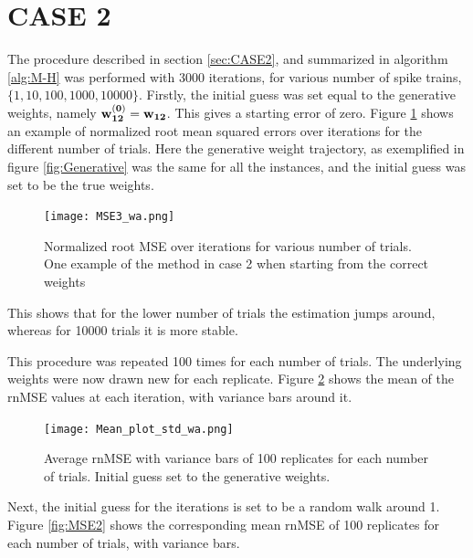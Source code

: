 \section{CASE 2}
\label{sec:CASE2_r}
The procedure described in section \ref{sec:CASE2}, and summarized in algorithm \ref{alg:M-H} was performed with 3000 iterations, for various number of spike trains, $ \{1,10,100,1000,10000 \}$. Firstly, the initial guess was set equal to the generative weights, namely $\bf w_{12}^{(0)} = \bf w_{12}$. This gives a starting error of zero. Figure \ref{fig:Case2_1} shows an example of normalized root mean squared errors over iterations for the different number of trials. Here the generative weight trajectory, as exemplified in figure \ref{fig:Generative} was the same for all the instances, and the initial guess was set to be the true weights. 


\begin{figure}[hbt!]
\caption{Normalized root MSE over iterations for various number of trials. One example of the method in case 2 when starting from the correct weights}
\label{fig:Case2_1}
    \centering
    \texttt{[image: MSE3\_wa.png]}
\end{figure}

This shows that for the lower number of trials the estimation jumps around, whereas for 10000 trials it is more stable.

This procedure was repeated 100 times for each number of trials. The underlying weights were now drawn new for each replicate. Figure \ref{fig:case2_avg} shows the mean of the rnMSE values at each iteration, with variance bars around it. 

\begin{figure}[hbt!]
\caption{Average rnMSE with variance bars of 100 replicates for each number of trials. Initial guess set to the generative weights.}
\label{fig:case2_avg}
    \centering
    \texttt{[image: Mean\_plot\_std\_wa.png]}
\end{figure}



Next, the initial guess for the iterations is set to be a random walk around 1. Figure \ref{fig:MSE2} shows the corresponding mean rnMSE of 100 replicates for each number of trials, with variance bars. 



